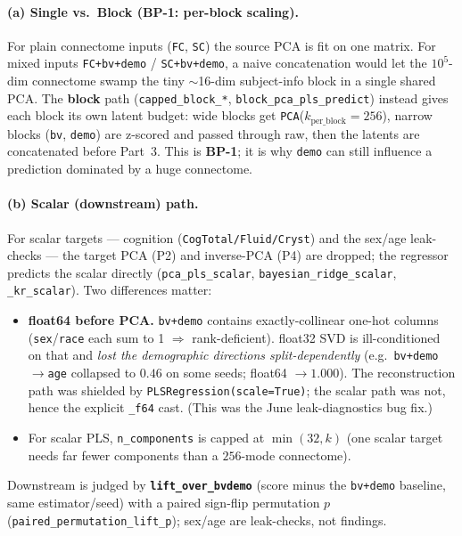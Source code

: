 \documentclass[11pt]{article}
\newcommand{\code}[1]{\texttt{#1}}
\begin{document}
\paragraph{(a) Single vs.\ Block (BP-1: per-block scaling).}
For plain connectome inputs (\code{FC}, \code{SC}) the source PCA is fit on one matrix.
For mixed inputs \code{FC+bv+demo} / \code{SC+bv+demo}, a naive concatenation would let the
$10^5$-dim connectome swamp the tiny $\sim$16-dim subject-info block in a single shared PCA. The
\textbf{block} path (\code{capped\_block\_*}, \code{block\_pca\_pls\_predict}) instead gives each
block its own latent budget: wide blocks get \texttt{PCA}($k_{\mathrm{per\_block}}{=}256$), narrow
blocks (\code{bv}, \code{demo}) are z-scored and passed through raw, then the latents are
concatenated before Part~3. This is \textbf{BP-1}; it is why \code{demo} can still influence a
prediction dominated by a huge connectome.

\paragraph{(b) Scalar (downstream) path.}
For scalar targets --- cognition (\code{CogTotal/Fluid/Cryst}) and the sex/age leak-checks --- the
target PCA (P2) and inverse-PCA (P4) are dropped; the regressor predicts the scalar directly
(\code{pca\_pls\_scalar}, \code{bayesian\_ridge\_scalar}, \code{\_kr\_scalar}). Two differences
matter:
\begin{itemize}[leftmargin=1.4em]
\item \textbf{float64 before PCA.} \code{bv+demo} contains exactly-collinear one-hot columns
  (\code{sex}/\code{race} each sum to 1 $\Rightarrow$ rank-deficient). float32 SVD is
  ill-conditioned on that and \emph{lost the demographic directions split-dependently}
  (e.g.\ \code{bv+demo}$\to$\code{age} collapsed to $0.46$ on some seeds; float64 $\to 1.000$).
  The reconstruction path was shielded by \code{PLSRegression(scale=True)}; the scalar path was
  not, hence the explicit \code{\_f64} cast. (This was the June leak-diagnostics bug fix.)
\item For scalar PLS, \code{n\_components} is capped at $\min(32,k)$ (one scalar target needs far
  fewer components than a $256$-mode connectome).
\end{itemize}
Downstream is judged by \textbf{\code{lift\_over\_bvdemo}} (score minus the \code{bv+demo}
baseline, same estimator/seed) with a paired sign-flip permutation $p$
(\code{paired\_permutation\_lift\_p}); sex/age are leak-checks, not findings.
\end{document}

